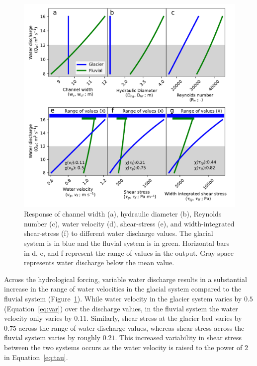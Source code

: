 \documentclass[11pt]{article}
\begin{document}
\begin{spacing}{1}
  \begin{center}
    \begin{figure}[H]
      \includegraphics[width=0.9\linewidth]{model_outputs.pdf}
      \caption{Response of channel width (a), hydraulic diameter (b),  Reynolds number  (c),  water velocity (d), shear-stress (e), and width-integrated shear-stress (f)  to different water discharge values. The glacial system is in blue and the fluvial system is in green.  Horizontal bars in d, e, and f represent the range of values in the  output. Gray space represents water discharge below the mean value. }
      \label{fig:model_outs}
    \end{figure}
  \end{center}
  
  Across the hydrological forcing, variable water discharge results in a substantial increase in the range of water velocities in the glacial system compared to the fluvial system (Figure~\ref{fig:model_outs}).
  While water velocity in the glacier system varies by  $0.5$ (Equation~\ref{eq:var}) over the discharge values, in the fluvial system the water velocity only varies by $0.11$.
  Similarly, shear stress at the glacier bed varies by $0.75$ across the range of water discharge values, whereas shear stress across the fluvial system varies by roughly $0.21$. This increased variability  in shear stress between the two systems occurs as the water velocity is raised to the power of $2$ in Equation~\ref{eq:tau}. 
  

\end{spacing}
\end{document}
